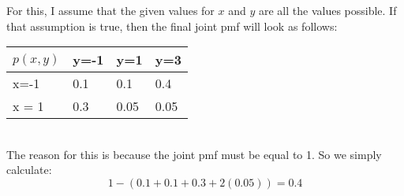 For this, I assume that the given values for $x$ and $y$ are all the values possible. If that assumption is true, then the final joint pmf will look as follows:\\
\begin{tabular}{l||l|l|l}
$p(x,y)$ & y=-1 & y=1  & y=3  \\ \hline
x=-1   & 0.1  & 0.1  & 0.4  \\ \hline
x = 1  & 0.3  & 0.05 & 0.05
\end{tabular}\\
The reason for this is because the joint pmf must be equal to 1. So we simply calculate:
$$
1 - (0.1 + 0.1 + 0.3 + 2(0.05)) = 0.4
$$